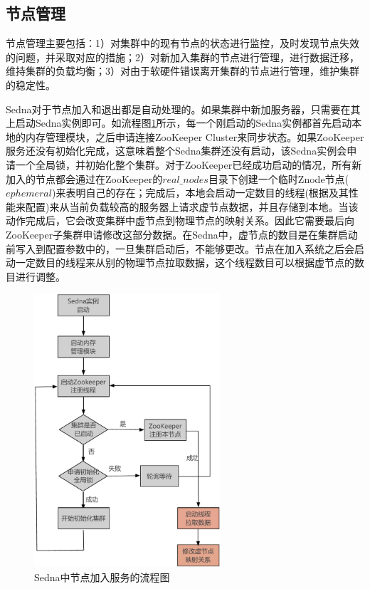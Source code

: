 \subsection{节点管理}
节点管理主要包括：1）对集群中的现有节点的状态进行监控，及时发现节点失效的问题，并采取对应的措施；2）对新加入集群的节点进行管理，进行数据迁移，维持集群的负载均衡；3）对由于软硬件错误离开集群的节点进行管理，维护集群的稳定性。

Sedna对于节点加入和退出都是自动处理的。如果集群中新加服务器，只需要在其上启动Sedna实例即可。如流程图\ref{fig:sednastart}所示，每一个刚启动的Sedna实例都首先启动本地的内存管理模块，之后申请连接ZooKeeper Cluster来同步状态。如果ZooKeeper服务还没有初始化完成，这意味着整个Sedna集群还没有启动，该Sedna实例会申请一个全局锁，并初始化整个集群。对于ZooKeeper已经成功启动的情况，所有新加入的节点都会通过在ZooKeeper的$real\_nodes$目录下创建一个临时Znode节点($ephemeral$)来表明自己的存在；完成后，本地会启动一定数目的线程(根据及其性能来配置)来从当前负载较高的服务器上请求虚节点数据，并且存储到本地。当该动作完成后，它会改变集群中虚节点到物理节点的映射关系。因此它需要最后向ZooKeeper子集群申请修改这部分数据。在Sedna中，虚节点的数目是在集群启动前写入到配置参数中的，一旦集群启动后，不能够更改。节点在加入系统之后会启动一定数目的线程来从别的物理节点拉取数据，这个线程数目可以根据虚节点的数目进行调整。

\begin{figure}[h!]
\centering
\includegraphics[height=4in]{../figures/sednastart.pdf}
\caption{Sedna中节点加入服务的流程图}
\label{fig:sednastart}
\end{figure}

